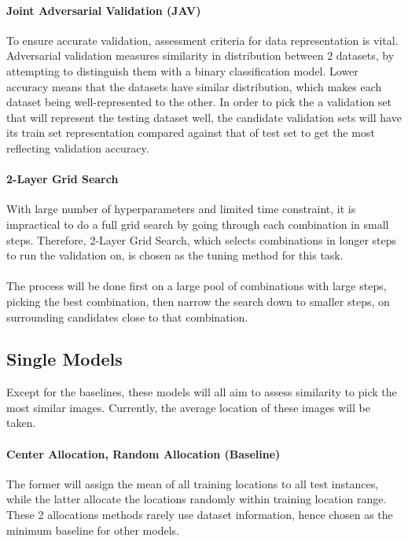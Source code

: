 \documentclass[11pt]{article}
\begin{document}
\begin{multicols}{2}
\paragraph{Joint Adversarial Validation (JAV)} To ensure accurate validation, assessment criteria for data representation is vital. Adversarial validation \cite{Pan2020AdversarialVA} measures similarity in distribution between 2 datasets, by attempting to distinguish them with a binary classification model. Lower accuracy means that the datasets have similar distribution, which makes each dataset being well-represented to the other. In order to pick the a validation set that will represent the testing dataset well, the candidate validation sets will have its train set representation compared against that of test set to get the most reflecting validation accuracy. 

\vspace{-0.4cm}
\paragraph{2-Layer Grid Search} With large number of hyperparameters and limited time constraint, it is impractical to do a full grid search by going through each combination in small steps. Therefore, 2-Layer Grid Search, which selects combinations in longer steps to run the validation on, is chosen as the tuning method for this task. \\~\\
The process will be done first on a large pool of combinations with large steps, picking the best combination, then narrow the search down to smaller steps, on surrounding candidates close to that combination.

\subsection{Single Models}
Except for the baselines, these models will all aim to assess similarity to pick the most similar images. Currently, the average location of these images will be taken.
\vspace{-0.4cm}
\paragraph{Center Allocation, Random Allocation (Baseline)} The former will assign the mean of all training locations to all test instances, while the latter allocate the locations randomly within training location range. These 2 allocations methods rarely use dataset information, hence chosen as the minimum baseline for other models.
\vspace{-0.4cm}

\end{multicols}
\end{document}
